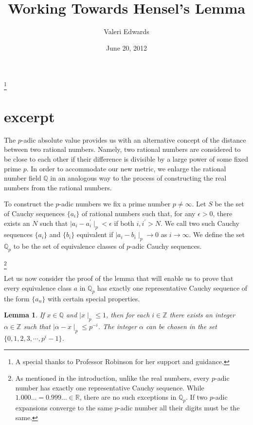 \documentclass[12pt]{amsart}
\theoremstyle{plain}
\newtheorem{lemma}[theorem]{Lemma}
\theoremstyle{definition}
\begin{document}
\title{Working Towards Hensel's Lemma}
\author{Valeri Edwards}
\thanks{A special thanks to Professor Robinson for her support and guidance.}
\date{June 20, 2012}

\maketitle
\section{excerpt}


The $p$-adic absolute value provides us with an alternative concept of the distance between two rational numbers. Namely, two rational numbers are considered to be close to each other if their difference is divisible by a large power of some fixed prime $p$.  In order to accommodate our new metric, we enlarge the rational number field $\mathbb{Q}$ in an analogous way to the process of constructing the real numbers from the  rational numbers.  


To construct the $p$-adic numbers we fix a prime number $p \ne \infty$. Let $S$ be the set of Cauchy sequences $\{a_i\}$ of rational numbers such that, for any $\epsilon > 0$, there exists an $N$ such that $\mid a_i - a^{\prime}_i \mid_p < \epsilon$ if both $i, i^{\prime} > N$. We call two such Cauchy sequences $\{a_i\}$ and $\{b_i\}$ equivalent if $\mid a_i - b_i \mid_p \rightarrow 0$ as $i \rightarrow \infty$.  We define the set $\mathbb{Q}_p$ to be the set of equivalence classes of $p$-adic Cauchy sequences.

\footnote{As mentioned in the introduction,  unlike the real numbers, every $p$-adic number has exactly one representative Cauchy sequence. While $1.000 \dots  = 0.999\dots \in \mathbb{R}$, there are no such exceptions in $\mathbb{Q}_p$. If two $p$-adic expansions converge to the same $p$-adic number all their digits must be the same.}



 Let us now consider the proof of the lemma that will enable us to prove that every equivalence class $a$ in $\mathbb{Q}_p$ has exactly one representative Cauchy sequence of the form $\{a_n\}$ with certain special properties. 

\begin{lemma}
If $x \in \mathbb{Q}$ and $\mid x \mid_p \le 1$, then for each $i \in \mathbb{Z}$ there exists an integer $\alpha \in \mathbb{Z}$ such that $\mid \alpha - x \mid_p \le p^{-i}$. The integer $\alpha$ can be chosen in the set $\{0, 1, 2, 3, \cdots, p^i - 1 \}$.
\end{lemma}
\end{document}
